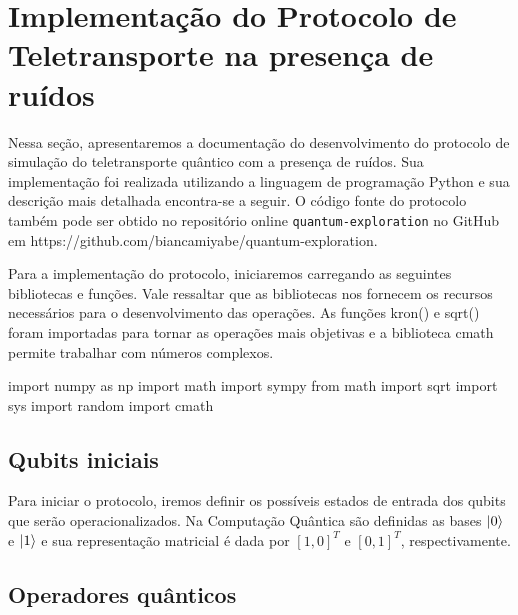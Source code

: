 
\chapter{Implementação do Protocolo de Teletransporte na presença de ruídos}\label{app:protocolo}

Nessa seção, apresentaremos a documentação do desenvolvimento do protocolo de simulação do teletransporte quântico com a presença de ruídos. Sua implementação foi realizada utilizando a linguagem de programação Python e sua descrição mais detalhada encontra-se a seguir. O código fonte do protocolo também pode ser obtido no repositório online \texttt{quantum-exploration} no GitHub em \hypertarget{repositório}{https://github.com/biancamiyabe/quantum-exploration}.

Para a implementação do protocolo, iniciaremos carregando as seguintes bibliotecas e funções. Vale ressaltar que as bibliotecas nos fornecem os recursos necessários para o desenvolvimento das operações. As funções kron() e sqrt() foram importadas para tornar as operações mais objetivas e a biblioteca cmath permite trabalhar com números complexos.
\begin{pycode}
    import numpy as np
    import math
    import sympy
    from math import sqrt
    import sys
    import random
    import cmath
\end{pycode}

\section{Qubits iniciais}\label{qubits-iniciais}

Para iniciar o protocolo, iremos definir os possíveis estados de entrada dos qubits que serão operacionalizados. Na Computação Quântica são definidas as bases \(\ket{0}\) e \(\ket{1}\) e sua representação matricial é dada por \([1, 0]^{T}\) e \([0, 1]^{T}\), respectivamente.

\section{Operadores quânticos}\label{operadores-quuxe2nticos}

